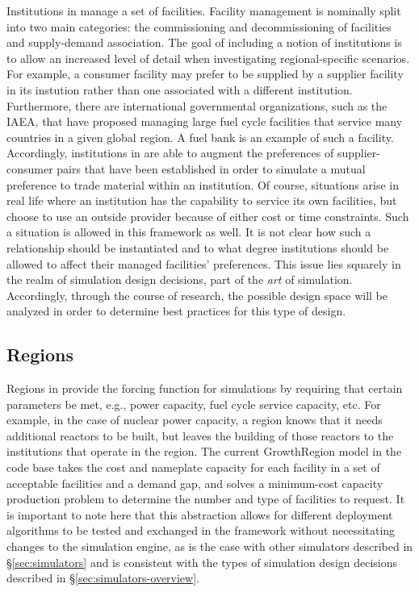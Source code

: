 Institutions in \Cyclus manage a set of facilities. Facility management is
nominally split into two main categories: the commissioning and decommissioning
of facilities and supply-demand association. The goal of including a notion of
institutions is to allow an increased level of detail when investigating
regional-specific scenarios. For example, a consumer facility may prefer to be
supplied by a supplier facility in its instution rather than one associated with
a different institution. Furthermore, there are international governmental
organizations, such as the IAEA, that have proposed managing large fuel cycle
facilities that service many countries in a given global region. A fuel bank is
an example of such a facility. Accordingly, institutions in \Cyclus are able to
augment the preferences of supplier-consumer pairs that have been established in
order to simulate a mutual preference to trade material within an
institution. Of course, situations arise in real life where an institution has
the capability to service its own facilities, but choose to use an outside
provider because of either cost or time constraints. Such a situation is allowed
in this framework as well. It is not clear how such a relationship should be
instantiated and to what degree institutions should be allowed to affect their
managed facilities' preferences. This issue lies squarely in the realm of
simulation design decisions, part of the \textit{art} of
simulation. Accordingly, through the course of research, the possible design
space will be analyzed in order to determine best practices for this type of
design.

\subsection{Regions}

Regions in \Cyclus provide the forcing function for simulations by requiring
that certain parameters be met, e.g., power capacity, fuel cycle service
capacity, etc. For example, in the case of nuclear power capacity, a region
knows that it needs additional reactors to be built, but leaves the building of
those reactors to the institutions that operate in the region. The current
GrowthRegion model in the \Cycamore \cite{cycamore2013} code base takes the cost
and nameplate capacity for each facility in a set of acceptable facilities and a
demand gap, and solves a minimum-cost capacity production problem to determine
the number and type of facilities to request. It is important to note here that
this abstraction allows for different deployment algorithms to be tested and
exchanged in the \Cyclus framework without necessitating changes to the
simulation engine, as is the case with other simulators described
in \S\ref{sec:simulators} and is consistent with the types of simulation design
decisions described in
\S\ref{sec:simulators-overview}. 

